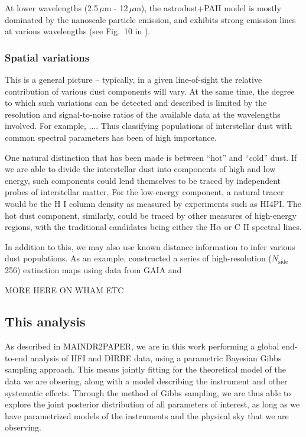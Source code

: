 \documentclass{aa}
\def\nside{$N_{\mathrm{side}}$}
\begin{document}
At lower wavelengths (2.5\,$\mu$m - 12\,$\mu$m), the astrodust+PAH model is mostly dominated by the nanoscale particle emission, and exhibits strong emission lines at various wavelengths (see Fig.~10 in \cite{Hensley2023}).

\subsubsection{Spatial variations}
This is a general picture -- typically, in a given line-of-sight the relative contribution of various dust components will vary. At the same time, the degree to which such variations can be detected and described is limited by the resolution and signal-to-noise ratios of the available data at the wavelengths involved. For example, .... Thus classifying populations of interstellar dust with common spectral parameters has been of high importance.

One natural distinction that has been made is between ``hot'' and ``cold'' dust. If we are able to divide the interstellar dust into components of high and low energy, such components could lend themselves to be traced by independent probes of interstellar matter. For the low-energy component, a natural tracer would be the H I column density as measured by experiments such as HI4PI. The hot dust component, similarly, could be traced by other measures of high-energy regions, with the traditional candidates being either the H$\alpha$ or C II spectral lines.

In addition to this, we may also use known distance information to infer various dust populations. As an example, \cite{edenhofer:2024} constructed a series of high-resolution (\nside 256) extinction maps using data from GAIA and

MORE HERE ON WHAM ETC

\subsection{This analysis}
As described in MAINDR2PAPER, we are in this work performing a global end-to-end analysis of HFI and DIRBE data, using a parametric Bayesian Gibbs sampling approach. This means jointly fitting for the theoretical model of the data we are obsering, along with a model describing the instrument and other systematic effects. Through the method of Gibbs sampling, we are thus able to explore the joint posterior distribution of all parameters of interest, as long as we have parametrized models of the instruments and the physical sky that we are observing.
\end{document}
